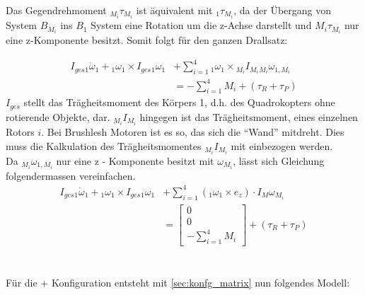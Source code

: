 Das Gegendrehmoment ${_{M_i} \tau_{M_i}}$ ist äquivalent mit ${_{1} \tau_{M_i}}$, da der Übergang von System $B_{M_i}$ ins $B_{1}$ System eine Rotation um die z-Achse darstellt und ${{M_i} \tau_{M_i}}$ nur eine z-Komponente besitzt. Somit folgt für den ganzen Drallsatz:

\begin{align}
    I_{ges} {_{1} \dot{\omega}_{1}} + {_{1} {\omega}_{1}} \times I_{ges} {_{1} {\omega}_{1}} &+ \sum_{i=1}^{4}{{_{1} {\omega}_{1}} \times {_{M_i} I_{M_i}} {_{M_i} {\omega}_{1, M_i}}} \\
    &= -\sum_{i = 1}^{4}{M_i} + (\tau_{R} + \tau_{P})
\end{align}
$I_{ges}$ stellt das Trägheitsmoment des Körpers 1, d.h. des Quadrokopters ohne rotierende Objekte, dar. ${_{M_i} I_{M_i}}$ hingegen ist das Trägheitsmoment, eines einzelnen Rotors $i$. Bei Brushlesh Motoren ist es so, das sich die ``Wand'' mitdreht. Dies muss die Kalkulation des Trägheitsmomentes ${_{M_i} I_{M_i}}$ mit einbezogen werden.\\
Da ${_{M_i} {\omega}_{1, M_i}}$ nur eine z - Komponente besitzt mit $\omega_{M_i}$, lässt sich Gleichung folgendermassen vereinfachen.
\begin{align}
    I_{ges} {_{1} \dot{\omega}_{1}} + {_{1} {\omega}_{1}} \times I_{ges} {_{1} {\omega}_{1}} &+ \sum_{i=1}^{4}{({_{1}{\omega}_{1}} \times e_z) \cdot I_{M} \omega_{M_i} } \\
    &= \begin{bmatrix} 0 \\ 0 \\ -\sum_{i = 1}^{4}{M_i} \end{bmatrix} + (\tau_{R} + \tau_{P})
\end{align}\\\\
Für die + Konfiguration entsteht mit \ref{sec:konfg_matrix} nun folgendes Modell:
